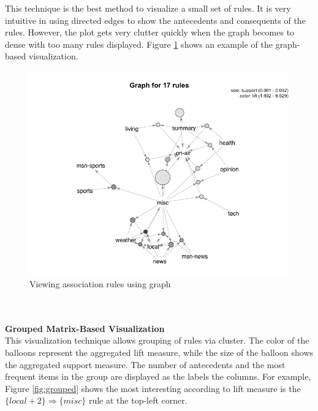 \documentclass{article}
\begin{document}
This technique is the best method to visualize a small set of rules.  It is very intuitive in using directed edges to show the antecedents and consequents of the rules.  However, the plot gets very clutter quickly when the graph becomes to dense with too many rules displayed. Figure \ref{fig:graph} shows an example of the graph-based visualization.
\begin{figure}[h!]
  \centering
    \includegraphics[width=1.0\textwidth]{images/graph}
    \caption{Viewing association rules using graph}
    \label{fig:graph}
\end{figure}
\\\\
\textbf{Grouped Matrix-Based Visualization}\\
This visualization technique allows grouping of rules via cluster.  The color of the balloons represent the aggregated lift measure, while the size of the balloon shows the aggregated support measure.  The number of antecedents and the most frequent items in the group are displayed as the labels the columns.  For example, Figure \ref{fig:grouped} shows the most interesting according to lift measure is the $\{local +2\} \Rightarrow \{misc\}$ rule at the top-left corner.
\end{document}
